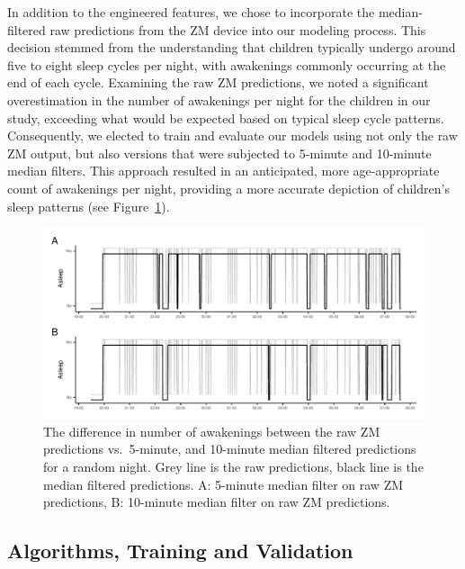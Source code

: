 \documentclass[
  super,
  preprint,
  3p]{elsarticle}
\begin{document}
In addition to the engineered features, we chose to incorporate the
median-filtered raw predictions from the ZM device into our modeling
process. This decision stemmed from the understanding that children
typically undergo around five to eight sleep cycles per night, with
awakenings commonly occurring at the end of each
cycle\citep{galland_normal_2012}. Examining the raw ZM predictions, we
noted a significant overestimation in the number of awakenings per night
for the children in our study, exceeding what would be expected based on
typical sleep cycle patterns. Consequently, we elected to train and
evaluate our models using not only the raw ZM output, but also versions
that were subjected to 5-minute and 10-minute median filters. This
approach resulted in an anticipated, more age-appropriate count of
awakenings per night, providing a more accurate depiction of children's
sleep patterns (see Figure~\ref{fig-zm-median}).

\begin{figure}[b]

{\centering \includegraphics{visuals/zm_raw_vs_filtered.pdf}

}

\caption{\label{fig-zm-median}The difference in number of awakenings
between the raw ZM predictions vs.~5-minute, and 10-minute median
filtered predictions for a random night. Grey line is the raw
predictions, black line is the median filtered predictions. A: 5-minute
median filter on raw ZM predictions, B: 10-minute median filter on raw
ZM predictions.}

\end{figure}

\hypertarget{algorithms-training-and-validation}{%
\subsection{Algorithms, Training and
Validation}\label{algorithms-training-and-validation}}
\end{document}
